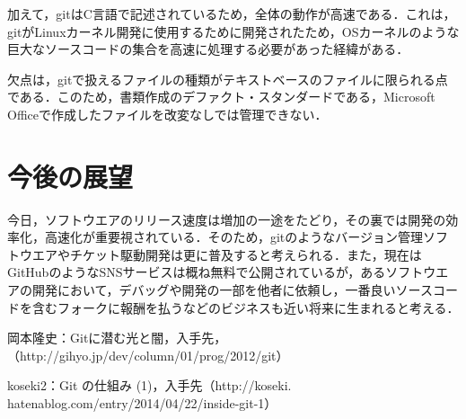 \documentclass[a4j,9pt,twocolumn]{jsarticle}
\begin{document}
加えて，gitはC言語で記述されているため，全体の動作が高速である．これは，gitがLinuxカーネル開発に使用するために開発されたため，OSカーネルのような巨大なソースコードの集合を高速に処理する必要があった経緯がある．

欠点は，gitで扱えるファイルの種類がテキストベースのファイルに限られる点である．このため，書類作成のデファクト・スタンダードである，Microsoft Officeで作成したファイルを改変なしでは管理できない．

\section{今後の展望}
今日，ソフトウエアのリリース速度は増加の一途をたどり，その裏では開発の効率化，高速化が重要視されている．そのため，gitのようなバージョン管理ソフトウエアやチケット駆動開発は更に普及すると考えられる．また，現在はGitHubのようなSNSサービスは概ね無料で公開されているが，あるソフトウエアの開発において，デバッグや開発の一部を他者に依頼し，一番良いソースコードを含むフォークに報酬を払うなどのビジネスも近い将来に生まれると考える．

\small
\begin{thebibliography}{99}
岡本隆史：Gitに潜む光と闇，入手先，（http://gihyo.jp/dev/column/01/prog/2012/git）

koseki2：Git の仕組み (1)，入手先（http://koseki.\\hatenablog.com/entry/2014/04/22/inside-git-1）
\end{thebibliography}
\end{document}
